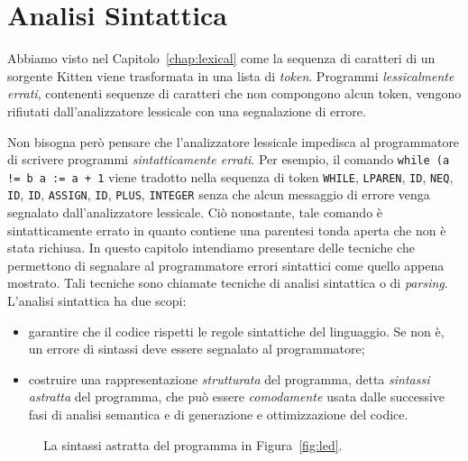 \chapter{Analisi Sintattica}\label{chap:syntactical}
%
\vspace*{-2ex}
\begin{center}
\end{center}
\vspace*{-2ex}
%
Abbiamo visto nel Capitolo~\ref{chap:lexical} come la sequenza di
caratteri di un sorgente Kitten viene trasformata in una lista
di \emph{token}. Programmi \emph{lessicalmente errati}, \cioe
contenenti sequenze di caratteri che non compongono alcun
token, vengono rifiutati dall'analizzatore lessicale con una segnalazione
di errore.

Non bisogna per\`o pensare che l'analizzatore lessicale impedisca
al programmatore di scrivere programmi \emph{sintatticamente errati}.
Per esempio, il comando \texttt{while (a != b a := a + 1} viene
tradotto nella sequenza di token \texttt{WHILE}, \texttt{LPAREN},
\texttt{ID}, \texttt{NEQ}, \texttt{ID}, \texttt{ID}, \texttt{ASSIGN},
\texttt{ID}, \texttt{PLUS}, \texttt{INTEGER} senza che alcun messaggio
di errore venga segnalato dall'analizzatore lessicale. Ci\`o nonostante,
tale comando \`e sintatticamente errato in quanto contiene una parentesi
tonda aperta che non \`e stata richiusa. In questo capitolo intendiamo
presentare delle tecniche che permettono di segnalare al programmatore
errori sintattici come quello appena mostrato. Tali tecniche sono
chiamate tecniche di analisi sintattica o di \emph{parsing}.
L'analisi sintattica ha due scopi:
%
\begin{itemize}
\item garantire
  che il codice rispetti le regole sintattiche del linguaggio. Se \cosi non
  \`e, un errore di sintassi deve essere segnalato al programmatore;
\item costruire una rappresentazione
  \emph{strutturata} del programma, detta \emph{sintassi astratta} del
  programma, che pu\`o essere \emph{comodamente}
  usata dalle successive fasi di analisi semantica e di generazione e
  ottimizzazione del codice.
\end{itemize}
%
\begin{figure}[t]
\begin{center}
\end{center}
\caption{La sintassi astratta del programma in Figura~\ref{fig:led}.}
  \label{fig:led_albero}
\end{figure}
